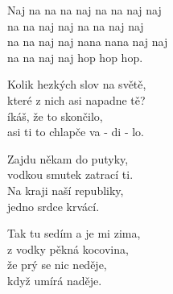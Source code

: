 
\cho{}
Naj na na na naj na na naj naj\\
na na naj naj na na naj naj\\
na na naj naj nana nana naj naj\\
na na naj naj hop hop hop.

\ve{}
Kolik hezkých slov na světě,\\
které z nich asi napadne tě?\\
íkáš, že to skončilo,\\
asi ti to chlapče va - di - lo.

\cho{}

\ve{}
Zajdu někam do putyky,\\
vodkou smutek zatrací ti.\\
Na kraji naší republiky,\\
jedno srdce krvácí.

\cho{}

\ve{}
Tak tu sedím a je mi zima,\\
z vodky pěkná kocovina,\\
že prý se nic neděje,\\
když umírá naděje.

\cho{}

\esong